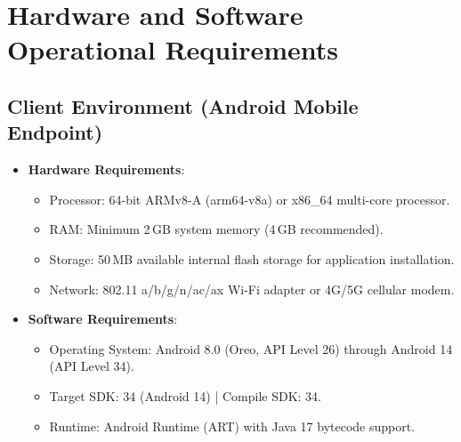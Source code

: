 \section{Hardware and Software Operational Requirements}
\label{sec:hardware_software_requirements}

\subsection{Client Environment (Android Mobile Endpoint)}
\begin{itemize}
    \item \textbf{Hardware Requirements}:
    \begin{itemize}
        \item Processor: 64-bit ARMv8-A (arm64-v8a) or x86\_64 multi-core processor.
        \item RAM: Minimum 2\,GB system memory (4\,GB recommended).
        \item Storage: 50\,MB available internal flash storage for application installation.
        \item Network: 802.11 a/b/g/n/ac/ax Wi-Fi adapter or 4G/5G cellular modem.
    \end{itemize}
    \item \textbf{Software Requirements}:
    \begin{itemize}
        \item Operating System: Android 8.0 (Oreo, API Level 26) through Android 14 (API Level 34).
        \item Target SDK: 34 (Android 14) | Compile SDK: 34.
        \item Runtime: Android Runtime (ART) with Java 17 bytecode support.
    \end{itemize}
\end{itemize}


